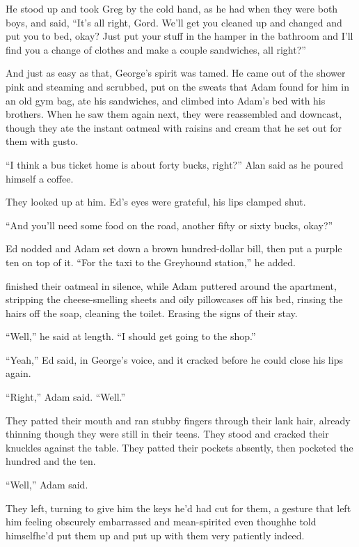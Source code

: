 He stood up and took Greg by the cold hand, as he had when they were
both boys, and said, ``It's all right, Gord.  We'll get you cleaned up
and changed and put you to bed, okay?  Just put your stuff in the
hamper in the bathroom and I'll find you a change of clothes and make
a couple sandwiches, all right?''

And just as easy as that, George's spirit was tamed.  He came out of
the shower pink and steaming and scrubbed, put on the sweats that Adam
found for him in an old gym bag, ate his sandwiches, and climbed into
Adam's bed with his brothers.  When he saw them again next, they were
reassembled and downcast, though they ate the instant oatmeal with
raisins and cream that he set out for them with gusto.

``I think a bus ticket home is about forty bucks, right?'' Alan said
as he poured himself a coffee.

They looked up at him.  Ed's eyes were grateful, his lips clamped
shut.

``And you'll need some food on the road, another fifty or sixty bucks,
okay?''

Ed nodded and Adam set down a brown hundred-dollar bill, then put a
purple ten on top of it.  ``For the taxi to the Greyhound station,''
he added.

 finished their oatmeal in silence, while Adam puttered around the
apartment, stripping the cheese-smelling sheets and oily pillowcases
off his bed, rinsing the hairs off the soap, cleaning the toilet. 
Erasing the signs of their stay.

``Well,'' he said at length.  ``I should get going to the shop.''

``Yeah,'' Ed said, in George's voice, and it cracked before he could
close his lips again.

``Right,'' Adam said.  ``Well.''

They patted their mouth and ran stubby fingers through their lank
hair, already thinning though they were still in their teens.  They
stood and cracked their knuckles against the table.  They patted their
pockets absently, then pocketed the hundred and the ten.

``Well,'' Adam said.

They left, turning to give him the keys he'd had cut for them, a
gesture that left him feeling obscurely embarrassed and mean-spirited
even though\dash{}he told himself\dash{}he'd put them up and put up with them
very patiently indeed.

